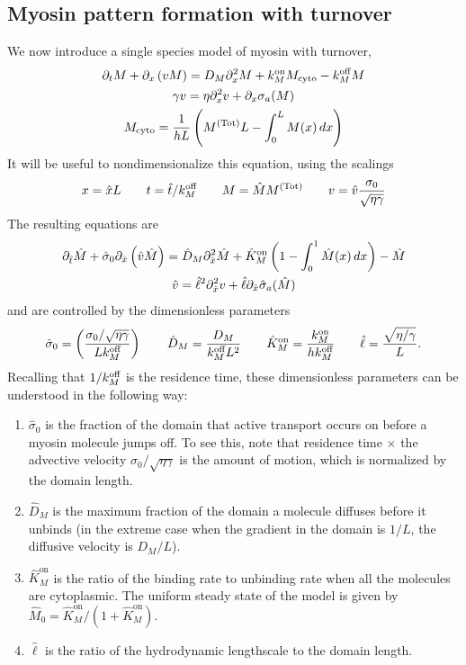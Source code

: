 \documentclass[11pt]{article}
\newcommand{\6}[1]{#1_{\text{6}}}
\newcommand{\3}[1]{#1_{\text{3}}}
\newcommand{\Tot}[1]{#1^\text{(Tot)}}
\newcommand{\My}[1]{#1_M}
\begin{document}
\subsection{Myosin pattern formation with turnover}
We now introduce a single species model of myosin with turnover, 
\begin{subequations}
\begin{gather}
\Dt M + \Dx \left(v M\right) = D_M \Dx^2 M +\My{\kon}M_\text{cyto} - \My{\koff} M \\
\label{eq:veleqndim}
\gamma v = \eta \Dx^2 v + \Dx \sigma_a(M)\\
M_\text{cyto} = \frac{1}{hL}\left(\Tot{M}L-\int_0^L M(x) \, dx\right)
\end{gather}
\end{subequations}
It will be useful to nondimensionalize this equation, using the scalings
\begin{equation}
\label{eq:NDD}
x = \hat{x} L \qquad t= \hat{t}/\My{\koff} \qquad M= \hat{M}\Tot{M} \qquad v = \hat{v} \frac{\sigma_0}{\sqrt{\eta \gamma}}
\end{equation}
The resulting equations are 
\begin{subequations}
\label{eq:MyosinEqs}
\begin{gather}
\label{eq:MND}
\partial_{\hat{t}} \hat{M} +\hat{\sigma}_0  \partial_{\hat{x}} \left(\hat{v} \hat{M} \right) =\hat{D}_M \partial_{\hat{x}}^2 \hat{M} +\hat{K}^\text{on}_M \left(1-\int_0^1  \hat{M}(x) \, dx\right) - \hat{M}\\
\label{eq:MVND}
\hat{v} = \hat{\ell}^2 \partial_{\hat{x}}^2 v +\hat{\ell} \partial_{\hat{x}} \hat{\sigma}_a(\hat{M})
 \end{gather}
\end{subequations}
and are controlled by the dimensionless parameters
\begin{equation}
\label{eq:NDparams}
\hat{\sigma}_0 = \left(\frac{\sigma_0/ \sqrt{\eta \gamma} }{L \My{\koff}}\right)   \qquad \hat{D}_M =\frac{D_M}{\My{\koff}  L^2} \qquad \hat{K}^\text{on}_M= \frac{\My{\kon}}{h \My{\koff}} \qquad \hat{\ell} = \frac{\sqrt{\eta/\gamma}}{L}.
\end{equation}
Recalling that $1/\My{\koff}$ is the residence time, these dimensionless parameters can be understood in the following way: 
\begin{enumerate}
\item $\hat{\sigma}_0$ is the fraction of the domain that active transport occurs on before a myosin molecule jumps off. To see this, note that residence time $\times$ the advective velocity $\sigma_0 / \sqrt{\eta \gamma}$ is the amount of motion, which is normalized by the domain length.
\item $\hat{D}_M$ is the maximum fraction of the domain a molecule diffuses before it unbinds (in the extreme case when the gradient in the domain is $1/L$, the diffusive velocity is $D_M/L$). 
\item $\hat{K}^\text{on}_M$ is the ratio of the binding rate to unbinding rate when all the molecules are cytoplasmic. The uniform steady state of the model is given by $\hat{M}_0= \hat{K}^\text{on}_M/\left(1+\hat{K}^\text{on}_M\right)$.
\item $\hat{\ell}$ is the ratio of the hydrodynamic lengthscale to the domain length.
\end{enumerate}
\end{document}
